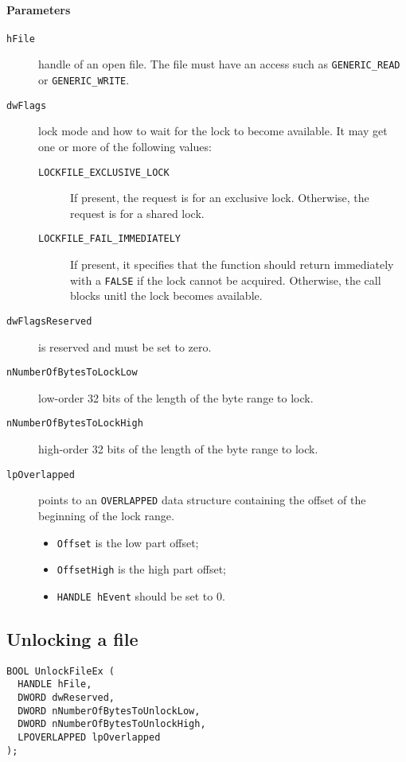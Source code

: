 \paragraph{Parameters}
\begin{description}
\item [\texttt{hFile}] handle of an open file. The file must have an access such as \texttt{GENERIC\_READ} or \texttt{GENERIC\_WRITE}.
\item [\texttt{dwFlags}] lock mode and how to wait for the lock to become available. It may get one or more of the following values:
\begin{description}
\item [\texttt{LOCKFILE\_EXCLUSIVE\_LOCK}] If present, the request is for an exclusive lock. Otherwise, the request is for a shared lock.
\item [\texttt{LOCKFILE\_FAIL\_IMMEDIATELY}] If present, it specifies that the function should return immediately with a \texttt{FALSE} if the lock cannot be acquired. Otherwise, the call blocks unitl the lock becomes available.
\end{description}
\item [\texttt{dwFlagsReserved}] is reserved and must be set to zero.
\item [\texttt{nNumberOfBytesToLockLow}] low-order 32 bits of the length of the byte range to lock.
\item [\texttt{nNumberOfBytesToLockHigh}] high-order 32 bits of the length of the byte range to lock.
\item [\texttt{lpOverlapped}] points to an \texttt{OVERLAPPED} data structure containing the offset of the beginning of the lock range.
\begin{itemize}
\item \texttt{Offset} is the low part offset;
\item \texttt{OffsetHigh} is the high part offset;
\item \texttt{HANDLE hEvent} should be set to 0.
\end{itemize}
\end{description}

\subsection{Unlocking a file}
\begin{verbatim}
BOOL UnlockFileEx (
  HANDLE hFile,
  DWORD dwReserved,
  DWORD nNumberOfBytesToUnlockLow,
  DWORD nNumberOfBytesToUnlockHigh,
  LPOVERLAPPED lpOverlapped
);
\end{verbatim}

